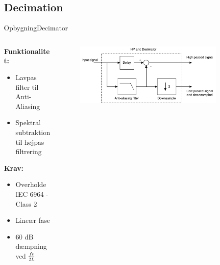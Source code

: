 \subsection{Decimation}
\begin{frame}{Opbygning}{Decimator}

\begin{columns}
  \begin{column}{0.4\textwidth}
  \textbf{Funktionalitet:}
\begin{itemize}
\item Lavpas filter til Anti-Aliasing
\item Spektral subtraktion til højpas filtrering 
\end{itemize}

\textbf{Krav:}
\begin{itemize}
\item Overholde IEC 6964 - Class 2
\item Lineær fase
\item 60 dB dæmpning ved $\frac{fs}{2L}$
\end{itemize}
  \end{column}
  \begin{column}{0.6\textwidth}
\begin{figure}
\centering
\includegraphics[width=0.9\textwidth]{designRealDecimator}
\end{figure}
  \end{column}
\end{columns}
\end{frame}

